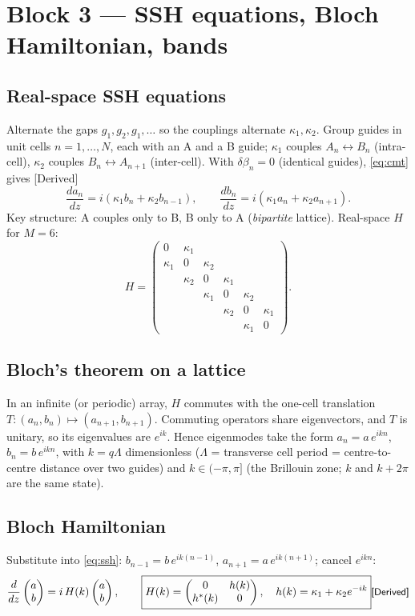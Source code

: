 \documentclass[10pt,a4paper]{article}
\newcommand{\ka}{\kappa_1}
\newcommand{\kc}{\kappa_2}
\newcommand{\evd}[1]{\textsf{\small[#1]}}
\begin{document}
\section{Block 3 --- SSH equations, Bloch Hamiltonian, bands}
\subsection{Real-space SSH equations}
Alternate the gaps $g_1,g_2,g_1,\dots$ so the couplings alternate $\ka,\kc$. Group guides in unit cells $n=1,\dots,N$, each with an A and a B guide; $\ka$ couples $A_n\!\leftrightarrow\!B_n$ (intra-cell), $\kc$ couples $B_n\!\leftrightarrow\!A_{n+1}$ (inter-cell). With $\delta\beta_n=0$ (identical guides), \eqref{eq:cmt} gives \evd{Derived}
\begin{equation}
\frac{da_n}{dz}=i(\ka b_n+\kc b_{n-1}),\qquad \frac{db_n}{dz}=i(\ka a_n+\kc a_{n+1}). \label{eq:ssh}
\end{equation}
Key structure: A couples only to B, B only to A (\emph{bipartite} lattice). Real-space $H$ for $M=6$:
\[
H=\begin{pmatrix}0&\ka&&&&\\ \ka&0&\kc&&&\\ &\kc&0&\ka&&\\ &&\ka&0&\kc&\\ &&&\kc&0&\ka\\ &&&&\ka&0\end{pmatrix}.
\]

\subsection{Bloch's theorem on a lattice}
In an infinite (or periodic) array, $H$ commutes with the one-cell translation $T:(a_n,b_n)\mapsto(a_{n+1},b_{n+1})$. Commuting operators share eigenvectors, and $T$ is unitary, so its eigenvalues are $e^{ik}$. Hence eigenmodes take the form $a_n=a\,e^{ikn}$, $b_n=b\,e^{ikn}$, with $k=q\Lambda$ dimensionless ($\Lambda$ = transverse cell period = centre-to-centre distance over two guides) and $k\in(-\pi,\pi]$ (the Brillouin zone; $k$ and $k+2\pi$ are the same state).

\subsection{Bloch Hamiltonian}
Substitute into \eqref{eq:ssh}: $b_{n-1}=b\,e^{ik(n-1)}$, $a_{n+1}=a\,e^{ik(n+1)}$; cancel $e^{ikn}$:
\[
\frac{d}{dz}\begin{pmatrix}a\\b\end{pmatrix}=i\,H(k)\begin{pmatrix}a\\b\end{pmatrix},\qquad
\boxed{H(k)=\begin{pmatrix}0&h(k)\\h^*(k)&0\end{pmatrix},\quad h(k)=\ka+\kc e^{-ik}} \evd{Derived}
\]
\end{document}
